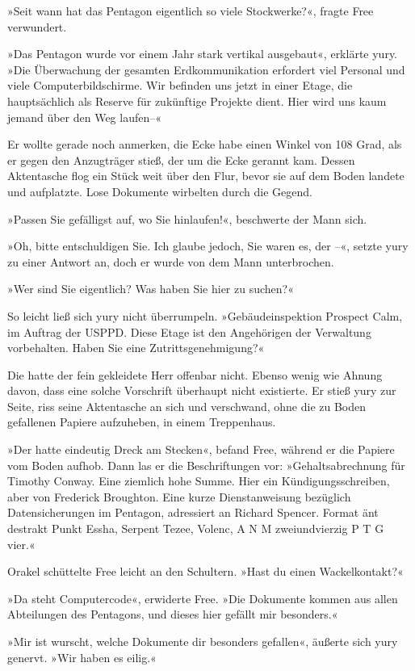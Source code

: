 »Seit wann hat das Pentagon eigentlich so viele Stockwerke?«, fragte Free verwundert.

»Das Pentagon wurde vor einem Jahr stark vertikal ausgebaut«, erklärte yury. »Die Überwachung der gesamten Erdkommunikation erfordert viel Personal und viele Computerbildschirme. Wir befinden uns jetzt in einer Etage, die hauptsächlich als Reserve für zukünftige Projekte dient. Hier wird uns kaum jemand über den Weg laufen–«

Er wollte gerade noch anmerken, die Ecke habe einen Winkel von 108 Grad, als er gegen den Anzugträger stieß, der um die Ecke gerannt kam. Dessen Aktentasche flog ein Stück weit über den Flur, bevor sie auf dem Boden landete und aufplatzte. Lose Dokumente wirbelten durch die Gegend.

»Passen Sie gefälligst auf, wo Sie hinlaufen!«, beschwerte der Mann sich.

»Oh, bitte entschuldigen Sie. Ich glaube jedoch, Sie waren es, der –«, setzte yury zu einer Antwort an, doch er wurde von dem Mann unterbrochen.

»Wer sind Sie eigentlich? Was haben Sie hier zu suchen?«

So leicht ließ sich yury nicht überrumpeln. »Gebäudeinspektion Prospect Calm, im Auftrag der USPPD. Diese Etage ist den Angehörigen der Verwaltung vorbehalten. Haben Sie eine Zutrittsgenehmigung?«

Die hatte der fein gekleidete Herr offenbar nicht. Ebenso wenig wie Ahnung davon, dass eine solche Vorschrift überhaupt nicht existierte. Er stieß yury zur Seite, riss seine Aktentasche an sich und verschwand, ohne die zu Boden gefallenen Papiere aufzuheben, in einem Treppenhaus.

»Der hatte eindeutig Dreck am Stecken«, befand Free, während er die Papiere vom Boden aufhob. Dann las er die Beschriftungen vor: »Gehaltsabrechnung für Timothy Conway. Eine ziemlich hohe Summe. Hier ein Kündigungsschreiben, aber von Frederick Broughton. Eine kurze Dienstanweisung bezüglich Datensicherungen im Pentagon, adressiert an Richard Spencer. Format änt destrakt Punkt Essha, Serpent Tezee, Volenc, A N M zweiundvierzig P T G vier.«

Orakel schüttelte Free leicht an den Schultern. »Hast du einen Wackelkontakt?«

»Da steht Computercode«, erwiderte Free. »Die Dokumente kommen aus allen Abteilungen des Pentagons, und dieses hier gefällt mir besonders.«

»Mir ist wurscht, welche Dokumente dir besonders gefallen«, äußerte sich yury genervt. »Wir haben es eilig.«

